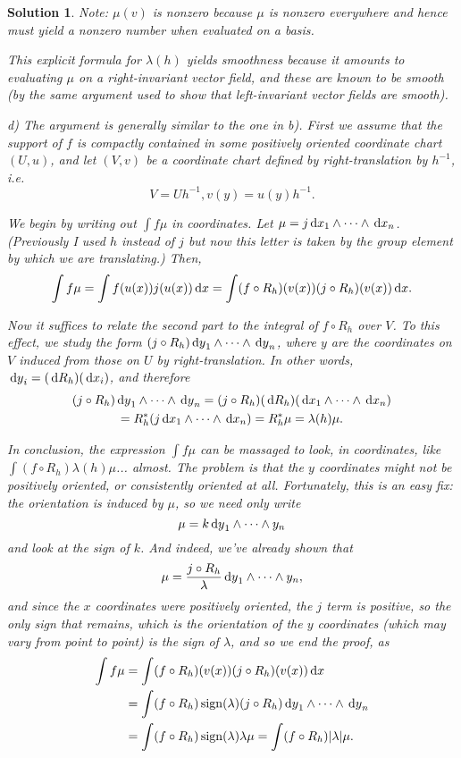 \documentclass{article}
\theoremstyle{nonumberplain}
\newtheorem{sol}{Solution}
\DeclareMathOperator{\sign}{sign}
\DeclarePairedDelimiter{\abs}{\lvert}{\rvert}
\begin{document}
\begin{sol}
Note: $\mu(v)$ is nonzero because $\mu$ is nonzero everywhere and hence must yield a nonzero number when evaluated on a basis.

This explicit formula for $\lambda(h)$ yields smoothness because it amounts to evaluating $\mu$ on a right-invariant vector field, and these are known to be smooth (by the same argument used to show that left-invariant vector fields are smooth).

\medskip

d) The argument is generally similar to the one in b). First we assume that the support of $f$ is compactly contained in some positively oriented coordinate chart $(U,u)$, and let $(V,v)$ be a coordinate chart defined by right-translation by $h^{-1}$, i.e.
\[V = U h^{-1}, v(y) = u(y) h^{-1}.\]

We begin by writing out $\int f \mu$ in coordinates. Let $\mu = j \dl x_1 \wedge \dots \wedge \dl x_n$. (Previously I used $h$ instead of $j$ but now this letter is taken by the group element by which we are translating.) Then,
\[\int f \mu = \int f(u(x)) j(u(x)) \dl x = \int (f \circ R_h)(v(x)) (j \circ R_h)(v(x)) \dl x.\]

Now it suffices to relate the second part to the integral of $f \circ R_h$ over $V$. To this effect, we study the form $(j \circ R_h) \dl y_1 \wedge \dots \wedge \dl y_n$, where $y$ are the coordinates on $V$ induced from those on $U$ by right-translation. In other words, $\dl y_i = (\dl R_h) (\dl x_i)$, and therefore
\begin{multline*}
(j \circ R_h) \dl y_1 \wedge \dots \wedge \dl y_n = (j \circ R_h) (\dl R_h)(\dl x_1 \wedge \dots \wedge \dl x_n)\\
= R_h^* (j \dl x_1 \wedge \dots \wedge \dl x_n) = R^*_h \mu = \lambda(h) \mu.
\end{multline*}

In conclusion, the expression $\int f \mu$ can be massaged to look, in coordinates, like $\int (f \circ R_h) \lambda(h) \mu$... almost. The problem is that the $y$ coordinates might not be positively oriented, or consistently oriented at all. Fortunately, this is an easy fix: the orientation is induced by $\mu$, so we need only write
\[ \mu = k \dl y_1 \wedge \dots \wedge y_n\]
and look at the sign of $k$. And indeed, we've already shown that
\[\mu = \frac{j \circ R_h}{\lambda} \dl y_1 \wedge \dots \wedge y_n,\]
and since the $x$ coordinates were positively oriented, the $j$ term is positive, so the only sign that remains, which is the orientation of the $y$ coordinates (which may vary from point to point) is the sign of $\lambda$, and so we end the proof, as
\begin{align*}
\int f \mu &= \int (f \circ R_h)(v(x)) (j \circ R_h)(v(x)) \dl x\\
&= \int (f \circ R_h) \sign(\lambda) (j \circ R_h) \dl y_1 \wedge \dots \wedge \dl y_n\\
&= \int (f \circ R_h) \sign(\lambda) \lambda \mu = \int (f \circ R_h) \abs\lambda \mu.
\end{align*}


\end{sol}
\end{document}
